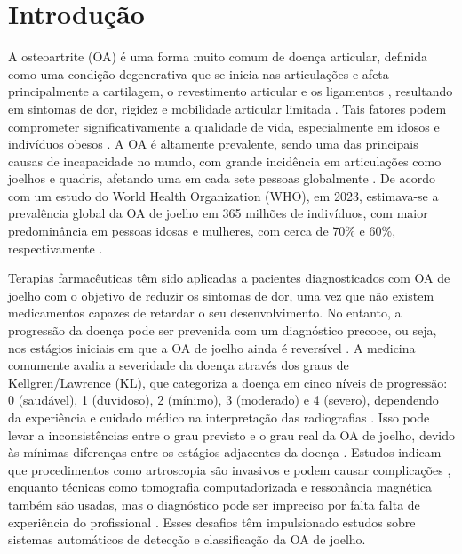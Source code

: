 
\chapter*[Introdução]{Introdução}

A osteoartrite (OA) é uma forma muito comum de doença articular, definida como uma condição degenerativa que se inicia nas articulações e afeta principalmente a cartilagem, o revestimento articular e os ligamentos \cite{Sardim2020}, resultando em sintomas de dor, rigidez e mobilidade articular limitada \cite{PACCA2018}. Tais fatores podem comprometer significativamente a qualidade de vida, especialmente em idosos e indivíduos obesos \cite{Luis2022}. A OA é altamente prevalente, sendo uma das principais causas de incapacidade no mundo, com grande incidência em articulações como joelhos e quadris, afetando uma em cada sete pessoas globalmente \cite{KELLGREN1957}. De acordo com um estudo do World Health Organization (WHO), em 2023, estimava-se a prevalência global da OA de joelho em 365 milhões de indivíduos, com maior predominância em pessoas idosas e mulheres, com cerca de 70\% e 60\%, respectivamente \cite{who2023}.

Terapias farmacêuticas têm sido aplicadas a pacientes diagnosticados com OA de joelho com o objetivo de reduzir os sintomas de dor, uma vez que não existem medicamentos capazes de retardar o seu desenvolvimento. No entanto, a progressão da doença pode ser prevenida com um diagnóstico precoce, ou seja, nos estágios iniciais em que a OA de joelho ainda é reversível \cite{Kanamoto2020}. A medicina comumente avalia a severidade da doença através dos graus de Kellgren/Lawrence (KL), que categoriza a doença em cinco níveis de progressão: 0 (saudável), 1 (duvidoso), 2 (mínimo), 3 (moderado) e 4 (severo), dependendo da experiência e cuidado médico na interpretação das radiografias \cite{KELLGREN1957}. Isso pode levar a inconsistências entre o grau previsto e o grau real da OA de joelho, devido às mínimas diferenças entre os estágios adjacentes da doença \cite{Mohammed2023}. Estudos indicam que procedimentos como artroscopia são invasivos e podem causar complicações \cite{Saraev2020}, enquanto técnicas como tomografia computadorizada e ressonância magnética também são usadas, mas o diagnóstico pode ser impreciso por falta falta de experiência do profissional \cite{Alshamrani2023}. Esses desafios têm impulsionado estudos sobre sistemas automáticos de detecção e classificação da OA de joelho.

